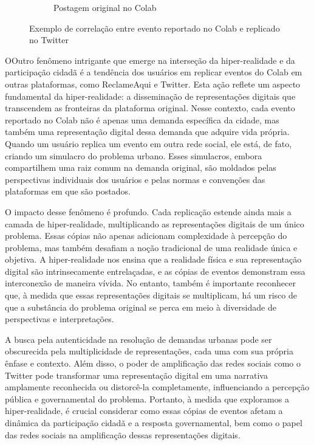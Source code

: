 \begin{figure}[!htb]
\begin{subfigure}{0.6\textwidth}
		\caption{Postagem original no Colab}
		\label{fig:colab_hiper_reality_corr_02}
	\end{subfigure}
	\caption{Exemplo de correlação entre evento reportado no Colab e replicado no Twitter}
	\label{fig:colab_hiper_reality}
\end{figure}

OOutro fenômeno intrigante que emerge na interseção da hiper-realidade e da participação cidadã é a tendência dos usuários em replicar eventos do Colab em outras plataformas, como ReclameAqui e Twitter. Esta ação reflete um aspecto fundamental da hiper-realidade: a disseminação de representações digitais que transcendem as fronteiras da plataforma original. Nesse contexto, cada evento reportado no Colab não é apenas uma demanda específica da cidade, mas também uma representação digital dessa demanda que adquire vida própria. Quando um usuário replica um evento em outra rede social, ele está, de fato, criando um simulacro do problema urbano. Esses simulacros, embora compartilhem uma raiz comum na demanda original, são moldados pelas perspectivas individuais dos usuários e pelas normas e convenções das plataformas em que são postados.

O impacto desse fenômeno é profundo. Cada replicação estende ainda mais a camada de hiper-realidade, multiplicando as representações digitais de um único problema. Essas cópias não apenas adicionam complexidade à percepção do problema, mas também desafiam a noção tradicional de uma realidade única e objetiva. A hiper-realidade nos ensina que a realidade física e sua representação digital são intrinsecamente entrelaçadas, e as cópias de eventos demonstram essa interconexão de maneira vívida. No entanto, também é importante reconhecer que, à medida que essas representações digitais se multiplicam, há um risco de que a substância do problema original se perca em meio à diversidade de perspectivas e interpretações.

A busca pela autenticidade na resolução de demandas urbanas pode ser obscurecida pela multiplicidade de representações, cada uma com sua própria ênfase e contexto. Além disso, o poder de amplificação das redes sociais como o Twitter pode transformar uma representação digital em uma narrativa amplamente reconhecida ou distorcê-la completamente, influenciando a percepção pública e governamental do problema. Portanto, à medida que exploramos a hiper-realidade, é crucial considerar como essas cópias de eventos afetam a dinâmica da participação cidadã e a resposta governamental, bem como o papel das redes sociais na amplificação dessas representações digitais.


